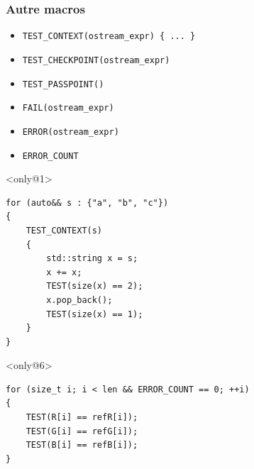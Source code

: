 \documentclass{beamer}
\begin{document}
\begin{frame}[fragile]
\frametitle{Autre macros}
\begin{itemize}[<+->]
 \item \lstinline|TEST_CONTEXT(ostream_expr) { ... }|
 \item \lstinline|TEST_CHECKPOINT(ostream_expr)|
 \item \lstinline|TEST_PASSPOINT()|
 \item \lstinline|FAIL(ostream_expr)|
 \item \lstinline|ERROR(ostream_expr)|
 \item \lstinline|ERROR_COUNT|
\end{itemize}

\begin{exampleblock}{}<only@1>
\begin{lstlisting}
for (auto&& s : {"a", "b", "c"})
{
    TEST_CONTEXT(s)
    {
        std::string x = s;
        x += x;
        TEST(size(x) == 2);
        x.pop_back();
        TEST(size(x) == 1);
    }
}
\end{lstlisting}
\end{exampleblock}

\begin{exampleblock}{}<only@6>
\begin{lstlisting}
for (size_t i; i < len && ERROR_COUNT == 0; ++i)
{
    TEST(R[i] == refR[i]);
    TEST(G[i] == refG[i]);
    TEST(B[i] == refB[i]);
}
\end{lstlisting}
\end{exampleblock}
\end{frame}
\end{document}
